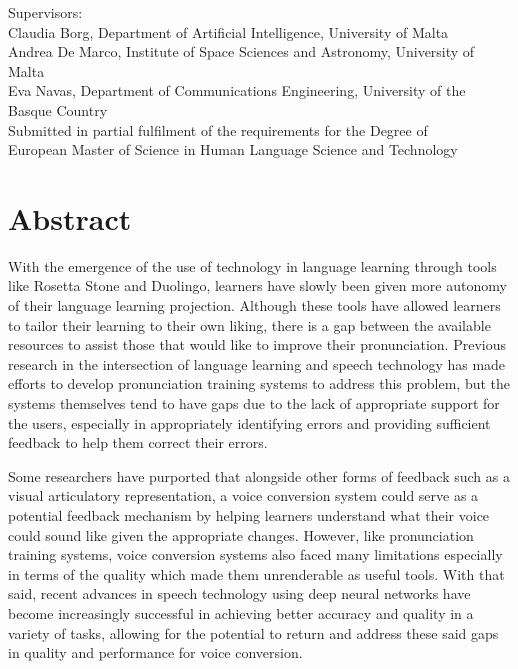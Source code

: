 \documentclass
[
    a4paper,
    twoside,
    12pt
]
{report}
\begin{document}
\begin{titlepage}
\begin{center}
       \vspace*{2.0cm}
	   Supervisors: \\
       Claudia Borg, Department of Artificial Intelligence, University of Malta \\
       Andrea De Marco, Institute of Space Sciences and Astronomy, University of Malta \\
       Eva Navas, Department of Communications Engineering, University of the Basque Country \\
       
       \vspace*{4.5cm}
       Submitted in partial fulfilment of the requirements for the Degree of \\
       European Master of Science in Human Language Science and Technology
    \end{center}
    

\end{titlepage}

\onehalfspacing
{}
\section*{Abstract}

With the emergence of the use of technology in language learning through
tools like Rosetta Stone and Duolingo, learners have slowly been given
more autonomy of their language learning projection. Although these
tools have allowed learners to tailor their learning to their own
liking, there is a gap between the available resources to assist those
that would like to improve their pronunciation. Previous research in the
intersection of language learning and speech technology has made efforts
to develop pronunciation training systems to address this problem, but
the systems themselves tend to have gaps due to the lack of appropriate
support for the users, especially in appropriately identifying errors
and providing sufficient feedback to help them correct their errors.

Some researchers have purported that alongside other forms of feedback
such as a visual articulatory representation, a voice conversion system
could serve as a potential feedback mechanism by helping learners
understand what their voice could sound like given the appropriate
changes. However, like pronunciation training systems, voice conversion
systems also faced many limitations especially in terms of the quality
which made them unrenderable as useful tools. With that said, recent
advances in speech technology using deep neural networks have become
increasingly successful in achieving better accuracy and quality in a
variety of tasks, allowing for the potential to return and address these
said gaps in quality and performance for voice conversion.
\end{document}
